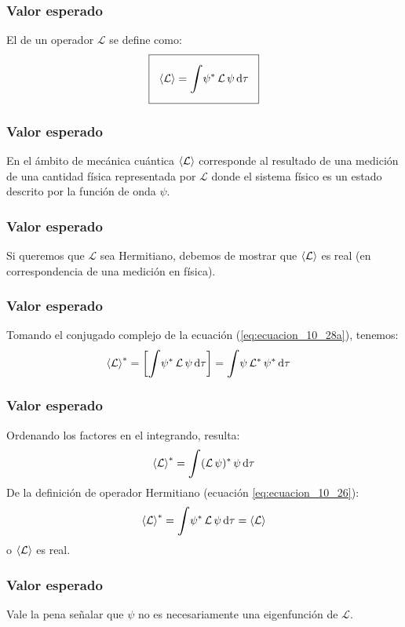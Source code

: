 \documentclass[12pt]{beamer}
\begin{document}
\begin{frame}
\frametitle{Valor esperado}
El  de un operador $\mathcal{L}$ se define como:
\pause
\begin{align}
\setlength{\fboxsep}{3\fboxsep}\boxed{\expval{\mathcal{L}} = \scaleint{6ex} \psi^{*} \, \mathcal{L} \, \psi \dd{\tau}}
\label{eq:ecuacion_10_28a}
\end{align}
\end{frame}
\begin{frame}
\frametitle{Valor esperado}
En el ámbito de mecánica cuántica $\expval{\mathcal{L}}$ corresponde al resultado de una medición de una cantidad física representada por $\mathcal{L}$ donde el sistema físico es un estado descrito por la función de onda $\psi$. 
\end{frame}
\begin{frame}
\frametitle{Valor esperado}
Si queremos que $\mathcal{L}$ sea Hermitiano, debemos de mostrar que $\expval{\mathcal{L}}$ es real (en correspondencia de una medición en física).
\end{frame}
\begin{frame}
\frametitle{Valor esperado}
Tomando el conjugado complejo de la ecuación (\ref{eq:ecuacion_10_28a}), tenemos:
\pause
\begin{align*}
\expval{\mathcal{L}}^{*} &= \left[ \scaleint{6ex} \psi^{*} \, \mathcal{L} \, \psi \dd{\tau} \right] = \scaleint{6ex} \psi \, \mathcal{L}^{*} \, \psi^{*} \dd{\tau}
\end{align*}
\end{frame}
\begin{frame}
\frametitle{Valor esperado}
Ordenando los factores en el integrando, resulta:
\pause
\begin{align*}
\expval{\mathcal{L}}^{*} = \scaleint{6ex} (\mathcal{L} \, \psi)^{*} \, \psi \dd{\tau}
\end{align*}
\pause
De la definición de operador Hermitiano (ecuación \ref{eq:ecuacion_10_26}):
\pause
\begin{equation}
\expval{\mathcal{L}}^{*} = \scaleint{6ex} \psi^{*} \, \mathcal{L} \, \psi \dd{\tau} = \expval{\mathcal{L}} 
\label{eq:ecuacion_10_28b}
\end{equation}
o $\expval{\mathcal{L}}$ es real.
\end{frame}
\begin{frame}
\frametitle{Valor esperado}
Vale la pena señalar que $\psi$ no es necesariamente una eigenfunción de $\mathcal{L}$.
\end{frame}
\end{document}
